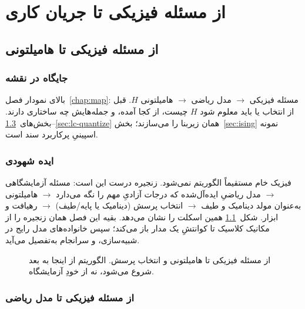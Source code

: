 \part{از مسئله فیزیکی تا جریان کاری}

\chapter{از مسئله فیزیکی تا هامیلتونی}
\label{chap:models}

\section{جایگاه در نقشه}

بالای نمودار فصل~\ref{chap:map}: مسئله فیزیکی $\to$ مدل ریاضی $\to$ هامیلتونی $H$. قبل از انتخاب  یا  باید معلوم شود $H$ چیست، از کجا آمده، و جمله‌هایش چه ساختاری دارند. بخش‌های~\ref{sec:phys-to-model}--\ref{sec:lc-quantize} همان زیربنا را می‌سازند؛ بخش~\ref{sec:ising} نمونه اسپینیِ پرکاربرد سند است.

\section{ایده شهودی}

فیزیک خام مستقیماً الگوریتم نمی‌شود. زنجیره درست این است: مسئله آزمایشگاهی $\to$ مدل ریاضیِ ایده‌آل‌شده که درجات آزادیِ مهم را نگه می‌دارد $\to$ هامیلتونی به‌عنوان مولد دینامیک و طیف $\to$ انتخاب پرسش (دینامیک یا پایه/طیف) $\to$ رهیافت و ابزار. شکل~\ref{fig:phys-to-H} همین اسکلت را نشان می‌دهد. بقیه این فصل همان زنجیره را از مکانیک کلاسیک تا کوانتشِ یک مدار  باز می‌کند؛ سپس خانواده‌های مدل رایج در شبیه‌سازی، و سرانجام  به‌تفصیل می‌آید.

\begin{figure}[htbp]
	\centering
	\begin{latin}
		\resizebox{\ifdim\width>\textwidth\textwidth\else\width\fi}{!}{%
		}
	\end{latin}
	\caption{از مسئله فیزیکی تا هامیلتونی و انتخاب پرسش. الگوریتم از اینجا به بعد شروع می‌شود، نه از خودِ آزمایشگاه.}
	\label{fig:phys-to-H}
\end{figure}

\section{از مسئله فیزیکی تا مدل ریاضی}
\label{sec:phys-to-model}

